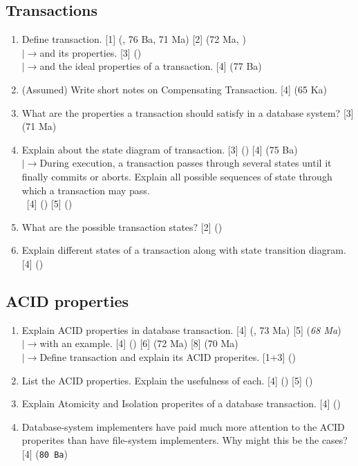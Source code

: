 \documentclass[12pt]{article}
\newcommand{\lb}{\\$\left|\rightarrow\right.$}
\newcommand{\enter}{\\\textcolor{white}{1}}
\begin{document}
    \subsection{Transactions}
            \begin{enumerate}[noitemsep, topsep=0pt]
                \item Define transaction. \hfill [1] (, 76 Ba, 71 Ma) [2] (72 Ma, )
                \lb and its properties. \hfill [3] ()
                \lb and the ideal properties of a transaction. \hfill [4] (77 Ba)

                \item (Assumed) Write short notes on Compensating Transaction. \hfill [4] (65 Ka)

                \item What are the properties a transaction should satisfy in a database system? \hfill [3] (71 Ma)

                \item Explain about the state diagram of transaction. \hfill [3] () [4] (75 Ba)
                \lb During execution, a transaction passes through several states until it finally commits or aborts. Explain all possible sequences of state through which a transaction may pass.
                \enter\hfill [4] () [5] ()
                
                \item What are the possible transaction states? \hfill [2] ()

                \item Explain different states of a transaction along with state transition diagram. \hfill [4] ()
            \end{enumerate}

    \subsection{ACID properties}
        \begin{enumerate}[noitemsep, topsep=0pt]
            \item Explain ACID properties in database transaction. \hfill [4] (, 73 Ma) [5] (\textit{68 Ma})
            \lb with an example. \hfill [4] () [6] (72 Ma) [8] (70 Ma)
            \lb Define transaction and explain its ACID properites. \hfill [1+3] ()

            \item List the ACID properties. Explain the usefulness of each. \hfill [4] () [5] ()

            \item Explain Atomicity and Isolation properites of a database transaction. \hfill [4] ()

            \item Database-system implementers have paid much more attention to the ACID properites than have file-system implementers. Why might this be the cases? \hfill [4] (\texttt{80 Ba})
        \end{enumerate}
\end{document}
